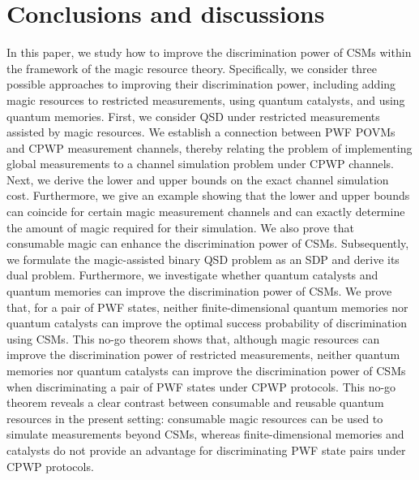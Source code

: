 \documentclass[aps,pra,twocolumn,floatfix,amsfonts,10pt]{revtex4-2}
\begin{document}
\section{Conclusions and discussions}
In this paper, we study how to improve the discrimination power of CSMs within the framework of the magic resource theory. 
Specifically, we consider three possible approaches to improving their discrimination power, including adding magic resources to restricted measurements, using quantum catalysts, and using quantum memories.
First, we consider QSD under restricted measurements assisted by magic resources. 
We establish a connection between PWF POVMs and CPWP measurement channels, thereby relating the problem of implementing global measurements to a channel simulation problem under CPWP channels. 
Next, we derive the lower and upper bounds on the exact channel simulation cost. 
Furthermore, we give an example showing that the lower and upper bounds can coincide for certain magic measurement channels and can exactly determine the amount of magic required for their simulation.
We also prove that consumable magic can enhance the discrimination power of CSMs.
Subsequently, we formulate the magic-assisted binary QSD problem as an SDP and derive its dual problem.
Furthermore, we investigate whether quantum catalysts and quantum memories can improve the discrimination power of CSMs. 
We prove that, for a pair of PWF states, neither finite-dimensional quantum memories nor quantum catalysts can improve the optimal success probability of discrimination using CSMs. 
This no-go theorem shows that, although magic resources can improve the discrimination power of restricted measurements, neither quantum memories nor quantum catalysts can improve the discrimination power of CSMs when discriminating a pair of PWF states under CPWP protocols. 
This no-go theorem reveals a clear contrast between consumable and reusable quantum resources in the present setting: consumable magic resources can be used to simulate measurements beyond CSMs, whereas finite-dimensional memories and catalysts do not provide an advantage for discriminating PWF state pairs under CPWP protocols.
\end{document}
